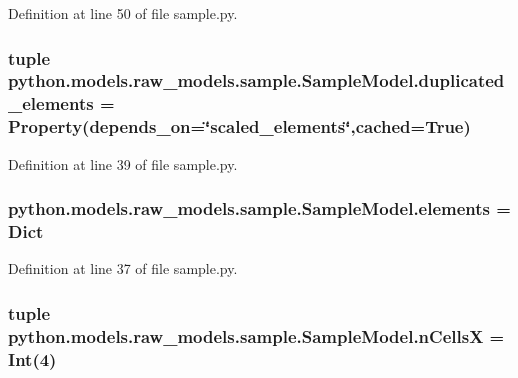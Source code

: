 Definition at line 50 of file sample.\-py.

\hypertarget{classpython_1_1models_1_1raw__models_1_1sample_1_1_sample_model_a7dad339f0323520b2952205f4dd16305}{
\subsubsection[{duplicated\-\_\-elements}]{\setlength{\rightskip}{0pt plus 5cm}tuple python.\-models.\-raw\-\_\-models.\-sample.\-Sample\-Model.\-duplicated\-\_\-elements = Property(depends\-\_\-on=\char`\"{}scaled\-\_\-elements\char`\"{},cached=True)\hspace{0.3cm}{\ttfamily [static]}}}\label{classpython_1_1models_1_1raw__models_1_1sample_1_1_sample_model_a7dad339f0323520b2952205f4dd16305}


Definition at line 39 of file sample.\-py.

\hypertarget{classpython_1_1models_1_1raw__models_1_1sample_1_1_sample_model_a310457df13fa5efb5e41aae0e04e447f}{
\subsubsection[{elements}]{\setlength{\rightskip}{0pt plus 5cm}python.\-models.\-raw\-\_\-models.\-sample.\-Sample\-Model.\-elements = Dict\hspace{0.3cm}{\ttfamily [static]}}}\label{classpython_1_1models_1_1raw__models_1_1sample_1_1_sample_model_a310457df13fa5efb5e41aae0e04e447f}


Definition at line 37 of file sample.\-py.

\hypertarget{classpython_1_1models_1_1raw__models_1_1sample_1_1_sample_model_a247c18efc90034b0ad541d3139fb0172}{
\subsubsection[{n\-Cells\-X}]{\setlength{\rightskip}{0pt plus 5cm}tuple python.\-models.\-raw\-\_\-models.\-sample.\-Sample\-Model.\-n\-Cells\-X = Int(4)\hspace{0.3cm}{\ttfamily [static]}}}\label{classpython_1_1models_1_1raw__models_1_1sample_1_1_sample_model_a247c18efc90034b0ad541d3139fb0172}


